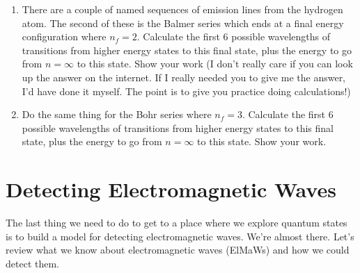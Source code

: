 \begin{exercise}
\begin{enumerate}
\item There are a couple of named sequences of emission lines from the hydrogen atom. The second of these is the Balmer series which ends at a final energy configuration where $n_f = 2$. Calculate the first 6 possible wavelengths of transitions from higher energy states to this final state, plus the energy to go from $n=\infty$ to this state. Show your work (I don't really care if you can look up the answer on the internet. If I really needed you to give me the answer, I'd have done it myself. The point is to give you practice doing calculations!)

\item Do the same thing for the Bohr series where $n_f = 3$. Calculate the first 6 possible wavelengths of transitions from higher energy states to this final state, plus the energy to go from $n=\infty$ to this state. Show your work.
\end{enumerate}
\end{exercise}

\section{Detecting Electromagnetic Waves}

The last thing we need to do to get to a place where we explore quantum states is to build a model for detecting electromagnetic waves. We're almost there. Let's review what we know about electromagnetic waves (ElMaWs) and how we could detect them.

